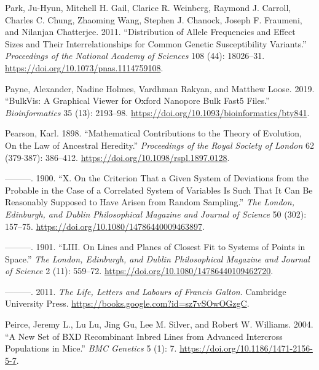 \documentclass[
]{book}
\newlength{\cslhangindent}
\newlength{\cslentryspacingunit} %
\newenvironment{CSLReferences}[2] %
 {%
  \setlength{\parindent}{0pt}
  \ifodd #1
  \let\oldpar\par
  \def\par{\hangindent=\cslhangindent\oldpar}
  \fi
  \setlength{\parskip}{#2\cslentryspacingunit}
 }%
 {}
\begin{document}
\begin{CSLReferences}{1}{0}
\leavevmode{}%
Park, Ju-Hyun, Mitchell H. Gail, Clarice R. Weinberg, Raymond J. Carroll, Charles C. Chung, Zhaoming Wang, Stephen J. Chanock, Joseph F. Fraumeni, and Nilanjan Chatterjee. 2011. {``Distribution of Allele Frequencies and Effect Sizes and Their Interrelationships for Common Genetic Susceptibility Variants.''} \emph{Proceedings of the National Academy of Sciences} 108 (44): 18026--31. \url{https://doi.org/10.1073/pnas.1114759108}.

\leavevmode{}%
Payne, Alexander, Nadine Holmes, Vardhman Rakyan, and Matthew Loose. 2019. {``{BulkVis}: A Graphical Viewer for {Oxford} Nanopore Bulk {Fast5} Files.''} \emph{Bioinformatics} 35 (13): 2193--98. \url{https://doi.org/10.1093/bioinformatics/bty841}.

\leavevmode{}%
Pearson, Karl. 1898. {``Mathematical Contributions to the Theory of Evolution, {On} the Law of Ancestral Heredity.''} \emph{Proceedings of the Royal Society of London} 62 (379-387): 386--412. \url{https://doi.org/10.1098/rspl.1897.0128}.

\leavevmode{}%
---------. 1900. {``X. {On} the Criterion That a Given System of Deviations from the Probable in the Case of a Correlated System of Variables Is Such That It Can Be Reasonably Supposed to Have Arisen from Random Sampling.''} \emph{The London, Edinburgh, and Dublin Philosophical Magazine and Journal of Science} 50 (302): 157--75. \url{https://doi.org/10.1080/14786440009463897}.

\leavevmode{}%
---------. 1901. {``{LIII}. {On} Lines and Planes of Closest Fit to Systems of Points in Space.''} \emph{The London, Edinburgh, and Dublin Philosophical Magazine and Journal of Science} 2 (11): 559--72. \url{https://doi.org/10.1080/14786440109462720}.

\leavevmode{}%
---------. 2011. \emph{The {Life}, {Letters} and {Labours} of {Francis Galton}}. {Cambridge University Press}. \url{https://books.google.com?id=sz7vSOwOGzgC}.

\leavevmode{}%
Peirce, Jeremy L., Lu Lu, Jing Gu, Lee M. Silver, and Robert W. Williams. 2004. {``A New Set of {BXD} Recombinant Inbred Lines from Advanced Intercross Populations in Mice.''} \emph{BMC Genetics} 5 (1): 7. \url{https://doi.org/10.1186/1471-2156-5-7}.


\end{CSLReferences}
\end{document}
